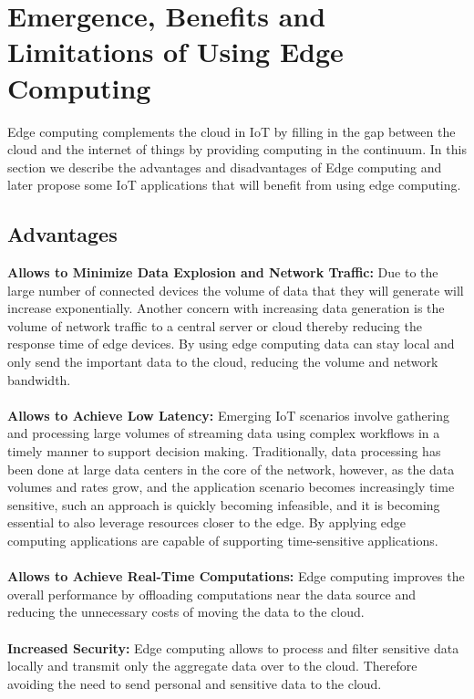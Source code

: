 \section{Emergence, Benefits and Limitations of Using Edge Computing}
Edge computing complements the cloud in IoT by filling in the gap between the cloud and the internet of things by providing computing in the continuum. In this section we describe the advantages and disadvantages of Edge computing and later propose some IoT applications that will benefit from using edge computing.

\subsection{Advantages}

\textbf{Allows to Minimize Data Explosion and Network Traffic:} Due to the large number of connected devices the volume of data that they will generate will increase exponentially. Another concern with increasing data generation is the volume of network traffic to a central server or cloud thereby reducing the response time of edge devices. By using edge computing data can stay local and only send the important data to the cloud, reducing the volume and network bandwidth.
\\\\
\textbf{Allows to Achieve Low Latency:} Emerging IoT scenarios involve gathering and processing large volumes of streaming data using complex workflows in a timely manner to support decision making. Traditionally, data processing has been done at large data centers in the core of the network, however, as the data volumes and rates grow, and the application scenario becomes increasingly time sensitive, such an approach is quickly becoming infeasible, and it is becoming essential to also leverage resources closer to the edge. By applying edge computing applications are capable of supporting time-sensitive applications.
\\\\
\textbf{Allows to Achieve Real-Time Computations:} Edge computing improves the overall performance by offloading computations near the data source and reducing the unnecessary costs of moving the data to the cloud. 
\\\\
\textbf{Increased Security:} Edge computing allows to process and filter sensitive data locally and transmit only the aggregate data over to the cloud. Therefore avoiding the need to send personal and sensitive data to the cloud.


